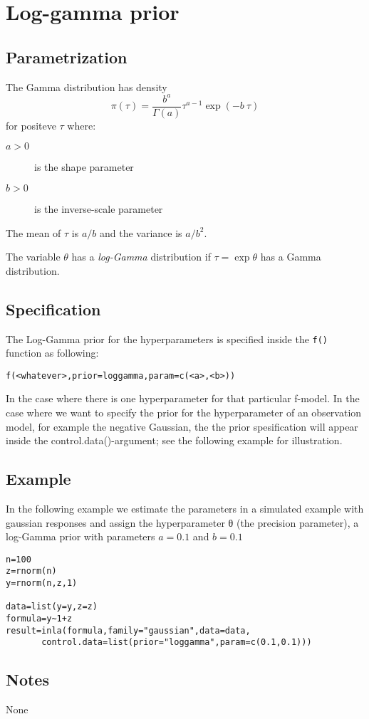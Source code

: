 \documentclass[a4paper,11pt]{article}
\begin{document}
\section*{ Log-gamma prior}

\subsection*{Parametrization}
The Gamma distribution has density
\begin{equation}
\pi(\tau)=\frac{b^a}{\Gamma(a)}\tau^{a-1}\exp(-b\ \tau)
\end{equation}
for positeve $\tau$ where:
\begin{description}
\item[$a>0$] is the shape parameter
\item[$b>0$] is the inverse-scale parameter
\end{description}
The mean of $\tau$ is $a/b$ and the variance is $a/b^2$.

The variable $\theta$ has a {\it log-Gamma} distribution if $\tau=\exp\theta$ has a Gamma distribution.

\subsection*{Specification}
The Log-Gamma prior for the hyperparameters is specified inside the {\tt f()} function as following:
\begin{center}
{\tt f(<whatever>,prior=loggamma,param=c(<a>,<b>))}
\end{center}
 In the case where there is one hyperparameter for that particular f-model. In the case where we want
to specify the prior for the hyperparameter of an observation model, for example the negative Gaussian, the the prior spesification will appear inside the control.data()-argument; see the following
example for illustration.

\subsection*{Example}

In the following example we estimate the parameters in a simulated example with gaussian
responses and assign the hyperparameter θ (the precision parameter), a log-Gamma prior with parameters $a=0.1$ and $b=0.1$


\begin{verbatim}
n=100
z=rnorm(n)
y=rnorm(n,z,1)

data=list(y=y,z=z)
formula=y~1+z
result=inla(formula,family="gaussian",data=data,
       control.data=list(prior="loggamma",param=c(0.1,0.1)))
\end{verbatim}

\subsection*{Notes}
None
\end{document}
